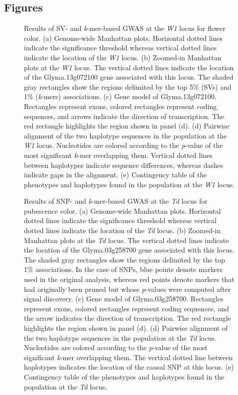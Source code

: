 \documentclass[doublespacing]{bmcart}
\begin{document}
\begin{backmatter}

\section*{Figures}

\begin{figure}[p]
	\caption{Results of SV- and \textit{k}-mer-based GWAS at the
	\textit{W1} locus for flower color. (a) Genome-wide Manhattan plots.
	Horizontal dotted lines indicate the significance
	threshold whereas vertical dotted lines indicate the location of the
	\textit{W1} locus. (b) Zoomed-in Manhattan plots at the \textit{W1} locus.
	The vertical dotted lines indicate the location of the
	Glyma.13g072100 gene associated with this locus. The shaded gray
	rectangles show the regions delimited by the top 5\% (SVs) and
	1\% (\textit{k}-mers) associations.  (c) Gene model of Glyma.13g072100.
	Rectangles represent exons, colored rectangles represent coding
	sequences, and arrows indicate the direction of transcription. The red
	rectangle highlights the region shown in panel (d). (d) Pairwise
	alignment of the two haplotype sequences in the population at the
	\textit{W1} locus. Nucleotides are
	colored according to the \textit{p}-value of the most significant
	\textit{k}-mer overlapping them. Vertical dotted lines between haplotypes
	indicate sequence differences, whereas dashes indicate gaps in the
	alignment. (e) Contingency table of the phenotypes and haplotypes found
	in the population at the \textit{W1} locus.}
	\label{flower-color-main-figure}
\end{figure}

\begin{figure}[p]
	\caption{Results of SNP- and \textit{k}-mer-based GWAS at the
	\textit{Td} locus for pubescence color. (a) Genome-wide Manhattan plots.
	Horizontal dotted lines indicate the significance
	threshold whereas vertical dotted lines indicate the location of the
	\textit{Td} locus. (b) Zoomed-in Manhattan plots at the \textit{Td} locus.
	The vertical dotted lines indicate the location of the
	Glyma.03g258700 gene associated with this locus. The shaded gray
	rectangles show the regions delimited by the top 1\% associations.
	In the case of SNPs, blue points denote markers used in the
	original analysis, whereas red points denote markers that had originally
	been pruned but whose \emph{p}-values were computed after signal
	discovery.
	(c) Gene model of Glyma.03g258700. Rectangles represent exons, colored
	rectangles represent coding sequences, and the arrow indicates the
	direction of transcription. The red rectangle highlights the region
	shown in panel (d). (d) Pairwise alignment of the two haplotype
	sequences in the population at the \textit{Td} locus. Nucleotides are
	colored according to the
	\textit{p}-value of the most significant \textit{k}-mer overlapping
	them. The vertical dotted line between haplotypes indicates the location of
	the causal SNP at this locus. (e) Contingency table of
	the phenotypes and haplotypes found in the population at the
	\textit{Td} locus.}
	\label{pubescence-color-main-figure}
\end{figure}


\end{backmatter}
\end{document}
